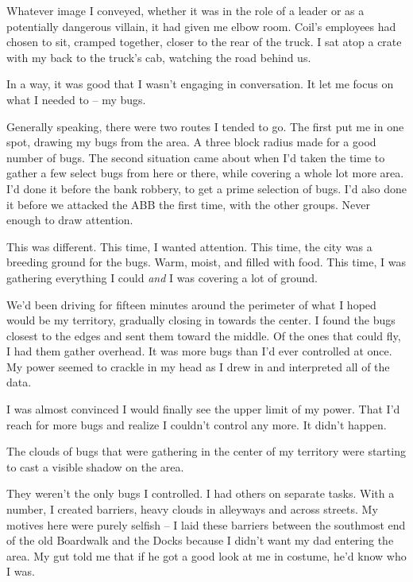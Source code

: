 Whatever image I conveyed, whether it was in the role of a leader or as a potentially dangerous villain, it had given me elbow room.  Coil's employees had chosen to sit, cramped together, closer to the rear of the truck.  I sat atop a crate with my back to the truck's cab, watching the road behind us.



In a way, it was good that I wasn't engaging in conversation.  It let me focus on what I needed to – my bugs.



Generally speaking, there were two routes I tended to go.  The first put me in one spot, drawing my bugs from the area.  A three block radius made for a good number of bugs.  The second situation came about when I'd taken the time to gather a few select bugs from here or there, while covering a whole lot more area.  I'd done it before the bank robbery, to get a prime selection of bugs.  I'd also done it before we attacked the ABB the first time, with the other groups.  Never enough to draw attention.



This was different.  This time, I wanted attention.  This time, the city was a breeding ground for the bugs.  Warm, moist, and filled with food.  This time, I was gathering everything I could \emph{and} I was covering a lot of ground.



We'd been driving for fifteen minutes around the perimeter of what I hoped would be my territory, gradually closing in towards the center.  I found the bugs closest to the edges and sent them toward the middle.  Of the ones that could fly, I had them gather overhead.  It was more bugs than I'd ever controlled at once.  My power seemed to crackle in my head as I drew in and interpreted all of the data.



I was almost convinced I would finally see the upper limit of my power.  That I'd reach for more bugs and realize I couldn't control any more.  It didn't happen.



The clouds of bugs that were gathering in the center of my territory were starting to cast a visible shadow on the area.



They weren't the only bugs I controlled.  I had others on separate tasks.  With a number, I created barriers, heavy clouds in alleyways and across streets.  My motives here were purely selfish – I laid these barriers between the southmost end of the old Boardwalk and the Docks because I didn't want my dad entering the area.  My gut told me that if he got a good look at me in costume, he'd know who I was.




